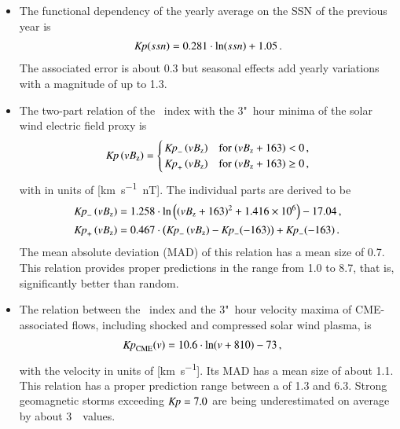 \begin{itemize}
	\item The functional dependency of the yearly \Kp{} average on the SSN of the previous year is
	\begin{align*}
		\textit{Kp}(ssn) = 0.281 \cdot \ln(ssn) + 1.05	\,.
	\end{align*}
	The associated \Kp{} error is about \num{0.3} but seasonal effects add yearly variations with a \Kp{} magnitude of up to 1.3.

	\item The two-part relation of the \Kp~index with the 3"~hour minima of the solar wind electric field proxy \vBz{} is
	\begin{align*}
		\text{\textit{Kp}}\left(vB_\text{z}\right) =
		\begin{cases}
			\,\text{\textit{Kp}}_-\left(vB_\text{z}\right) &\text{for~} (vB_\text{z} + 163) < 0	\,,\\
			\,\text{\textit{Kp}}_+\left(vB_\text{z}\right) &\text{for~} (vB_\text{z} + 163) \ge 0	\,,
		\end{cases}
	\end{align*}
	with \vBz{} in units of [\si{\km\per\s \nano\tesla}]. The individual parts are derived to be
	\begin{align*}
		\text{\textit{Kp}}_-\left(vB_\text{z}\right) &= 1.258 \cdot \ln\left(\left(vB_\text{z} + 163\right)^2 + \num{1.416e6}\right) - 17.04	\,,\\
		\text{\textit{Kp}}_+\left(vB_\text{z}\right) &= 0.467 \cdot \left(\text{\textit{Kp}}_-\left(vB_\text{z}\right) - \text{\textit{Kp}}_-(-163)\right) + \text{\textit{Kp}}_-(-163)	\,.
	\end{align*}
	The mean absolute deviation (MAD) of this relation has a mean \Kp{} size of \num{0.7}. This relation provides proper predictions in the \Kp{} range from \num{1.0} to \num{8.7}, that is, significantly better than random.

	\item The relation between the \Kp~index and the 3"~hour velocity maxima of CME-associated flows, including shocked and compressed solar wind plasma, is
	\begin{align*}
		\text{\textit{Kp}}_\text{CME}(v) &= 10.6 \cdot \ln(v + 810) - 73	\,,
	\end{align*}
	with the velocity in units of [\si{\km\per\s}]. Its MAD has a mean \Kp{} size of about \num{1.1}. This relation has a proper prediction range between a \Kp{} of \num{1.3} and \num{6.3}. Strong geomagnetic storms exceeding $\text{\textit{Kp}} = 7.0$ are being underestimated on average by about 3~\Kp~values.


\end{itemize}
